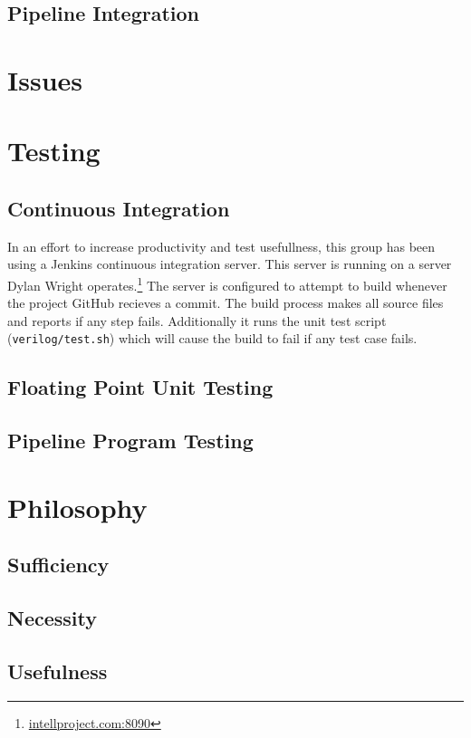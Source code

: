 \documentclass[conference]{IEEEtran}
\begin{document}
\subsection{Pipeline Integration}

\section{Issues}

\section{Testing}
\subsection{Continuous Integration}
In an effort to increase productivity and test usefullness, this group has
been using a Jenkins continuous integration server. This server is running
on a server Dylan Wright operates.\footnote{\url{intellproject.com:8090}} 
The server is configured to attempt to
build whenever the project GitHub recieves a commit. The build process makes
all source files and reports if any step fails. Additionally it runs the
unit test script (\texttt{verilog/test.sh}) which will cause the build to fail
if any test case fails.
\subsection{Floating Point Unit Testing}
\subsection{Pipeline Program Testing}

\section{Philosophy}
\subsection{Sufficiency}
\subsection{Necessity}
\subsection{Usefulness}



\end{document}
